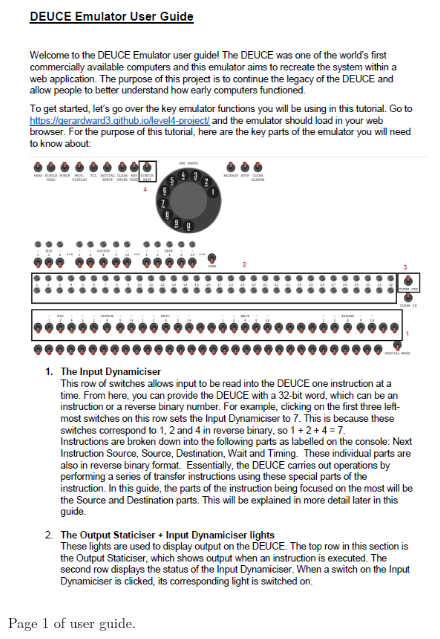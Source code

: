 \documentclass{l4proj}
\begin{document}
\begin{appendices}
\begin{figure}
	\centering
	\includegraphics{images/ug-1}
	\caption{Page 1 of user guide.}
	\label{fig:pg-1}
\end{figure}


\end{appendices}
\end{document}
